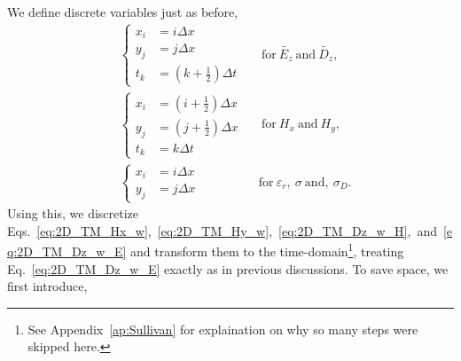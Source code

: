 \documentclass[12pt,twocolumn]{article}
\begin{document}
We define discrete variables just as before,
\begin{equation}
\begin{aligned}
&\left\{
\begin{split}
x_i&=i\Delta x \\
y_j&=j\Delta x \\
t_k&=\left(k+\frac{1}{2}\right)\Delta t
\end{split}\right.~~&~\mathrm{for}~\tilde{E_z}~\mathrm{and}~\tilde{D_z}, \\
&\left\{
\begin{split}
x_i&=\left(i+\frac{1}{2}\right)\Delta x \\
y_j&=\left(j+\frac{1}{2}\right)\Delta x \\
t_k&=k\Delta t
\end{split}\right.~~&~\mathrm{for}~H_x~\mathrm{and}~H_y,\\
&\left\{
\begin{split}
x_i&=i\Delta x \\
y_j&=j\Delta x 
\end{split}\right.~~&\mathrm{for}~\varepsilon_r,~\sigma~\mathrm{and},~\sigma_D.
\end{aligned}
\end{equation}
Using this, we discretize Eqs.~\ref{eq:2D_TM_Hx_w},~\ref{eq:2D_TM_Hy_w},~\ref{eq:2D_TM_Dz_w_H},~and~\ref{eq:2D_TM_Dz_w_E} and transform them to the time-domain\footnote{See Appendix~\ref{ap:Sullivan} for explaination on why so many steps were skipped here.}, treating Eq.~\ref{eq:2D_TM_Dz_w_E} exactly as in previous discussions. To save space, we first introduce,
\end{document}
